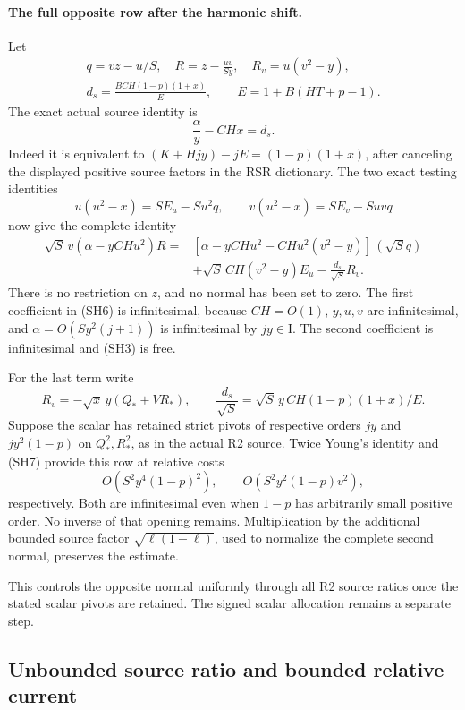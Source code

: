 \paragraph{The full opposite row after the harmonic shift.}
Let
\[
 \begin{gathered}
 q=vz-u/S,\quad R=z-\frac{uv}{Sy},\quad R_v=u(v^2-y),\\
 d_s=\frac{BCH(1-p)(1+x)}{E},\qquad E=1+B(HT+p-1).
 \end{gathered}
\]
The exact actual source identity is
\[
                 \frac{\alpha}{y}-CHx=d_s.             \tag{SH4}
\]
Indeed it is equivalent to
\((K+Hjy)-jE=(1-p)(1+x)\), after canceling the displayed
positive source factors in the RSR dictionary.
The two exact testing identities
\[
 u(u^2-x)=S E_u-Su^2q,\qquad
 v(u^2-x)=S E_v-Suvq                                  \tag{SH5}
\]
now give the complete identity
\[
\begin{split}
 \sqrt S\,v(\alpha-yCHu^2)R
 ={}&[\alpha-yCHu^2-CHu^2(v^2-y)]\,(\sqrt S q)\\
 &+\sqrt S\,CH(v^2-y)E_u-\frac{d_s}{\sqrt S}R_v .
\end{split}                                                     \tag{SH6}
\]
There is no restriction on \(z\), and no normal has been set to
zero.  The first coefficient in (SH6) is infinitesimal, because
\(CH=O(1)\), \(y,u,v\) are infinitesimal, and
\(\alpha=O(Sy^2(j+1))\) is infinitesimal by \(jy\in\mathrm I\).
The second coefficient is infinitesimal and (SH3) is free.

For the last term write
\[
 R_v=-\sqrt x\,y(Q_*+VR_*),\qquad
 \frac{d_s}{\sqrt S}
   =\sqrt S\,y\,CH(1-p)(1+x)/E.                         \tag{SH7}
\]
Suppose the scalar has retained strict pivots of respective orders
\(jy\) and \(jy^2(1-p)\) on \(Q_*^2,R_*^2\), as in the actual
R2 source.  Twice Young's identity and (SH7) provide this row at
relative costs
\[
 O(S^2y^4(1-p)^2),\qquad
 O(S^2y^2(1-p)v^2),                                   \tag{SH8}
\]
respectively.  Both are infinitesimal even when \(1-p\) has
arbitrarily small positive order.  No inverse of that opening
remains.  Multiplication by the additional bounded source
factor \(\sqrt{\ell(1-\ell)}\), used to normalize the complete
second normal, preserves the estimate.

This controls the opposite normal uniformly through all R2 source ratios
once the stated scalar pivots are retained. The signed scalar allocation
remains a separate step.

\subsection{Unbounded source ratio and bounded relative current}
\label{component:pb88ccd68a4bf}

